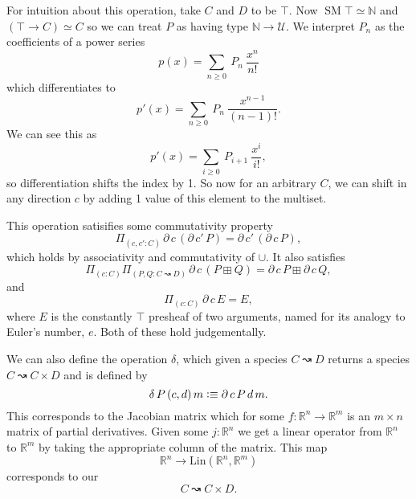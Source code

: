 \documentclass[12pt, parskip, DIV=14]{scrbook}
\newcommand{\defeq}{\vcentcolon\equiv}
\newcommand{\SM}{\operatorname{SM}}
\newcommand{\spec}[2]{#1 \rightwavearrow #2}
\begin{document}
For intuition about this operation, take $C$ and $D$ to be $\top$. Now $\SM \top \simeq \mathbb{N}$ and $(\top \to C) \simeq C$ so we can treat $P$ as having type $\mathbb{N} \to \mathcal{U}$. We interpret $P_n$ as the coefficients of a power series
$$p(x) = \sum_{n \geq 0}~P_n~\frac{x^n}{n!}$$
which differentiates to
$$p'(x) = \sum_{n \geq 0}~P_n~\frac{x^{n-1}}{(n-1)!}.$$ We can see this as
$$p'(x) = \sum_{i \geq 0}~P_{i+1}~\frac{x^i}{i!},$$ so differentiation shifts the index by 1. So now for an arbitrary $C$, we can shift in any direction $c$ by adding 1 value of this element to the multiset.

This operation satisifies some commutativity property
$$\Pi_{(c , c' : C)}\,\partial\,c\,(\partial\,c'\,P) = \partial\,c'\,(\partial\,c\,P),$$ which holds by associativity and commutativity of $\cup$. It also satisfies
$$\Pi_{(c : C)}\Pi_{(P , Q : \spec{C}{D})}\,\partial\,c\,(P \boxplus Q) = \partial\,c\,P \boxplus \partial\,c\,Q,$$
and
$$\Pi_{(c : C)}\,\partial\,c\,E = E,$$ where $E$ is the constantly $\top$ presheaf of two arguments, named for its analogy to Euler's number, $e$. Both of these hold judgementally.

We can also define the operation $\delta$, which given a species $\spec{C}{D}$ returns a species $\spec{C}{C \times D}$ and is defined by
$$\delta\,P\,(c , d)\,m \defeq \partial\,c\,P\,d\,m.$$
This corresponds to the Jacobian matrix which for some $f : \mathbb{R}^n \to \mathbb{R}^m$ is an $m \times n$ matrix of partial derivatives. Given some $j : \mathbb{R}^n$ we get a linear operator from $\mathbb{R}^n$ to $\mathbb{R}^m$ by taking the appropriate column of the matrix. This map
$$\mathbb{R}^n \to \mathrm{Lin}(\mathbb{R}^n,\mathbb{R}^m)$$
corresponds to our
$$\spec{C}{C \times D}.$$
\end{document}

